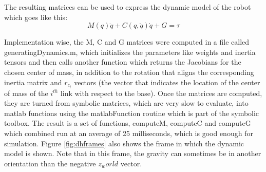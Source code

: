 The resulting matrices can be used to express the dynamic model of the robot which goes like this:
$$
M(q) \ddot{q} + C(q, \dot{q}) \dot{q} + G = \tau
$$

Implementation wise, the M, C and G matrices were computed in a file called generatingDynamics.m, which initializes the parameters like weights and inertia tensors and then calls another function which returns the Jacobians for the chosen center of mass, in addition to the rotation that aligns the corresponding inertia matrix and $r_{c_i}$ vectors (the vector that indicates the location of the center of mass of the $i^{th}$ link with respect to the base). Once the matrices are computed, they are turned from symbolic matrices, which are very slow to evaluate, into matlab functions using the matlabFunction routine which is part of the symbolic toolbox. The result is a set of functions, computeM, computeC and computeG which combined run at an average of 25 milliseconds, which is good enough for simulation. Figure \ref{fig:dhframes} also shows the frame in which the dynamic model is shown. Note that in this frame, the gravity can sometimes be in another orientation than the negative $z_world$ vector.



